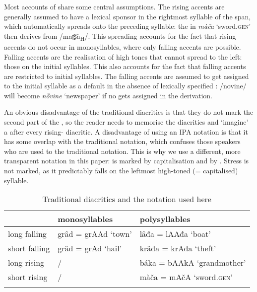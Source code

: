 \documentclass[output=paper, colorlinks, citecolor=brown, newtxmath]{langsci/langscibook}
\begin{document}
Most accounts of   share some central assumptions. The rising accents are generally assumed to have a lexical sponsor in the rightmost syllable of the span, which automatically spreads onto the preceding syllable: the  in \textit{màča} `sword.\textsc{gen}' then derives from /maʈ͡ʂa\textsubscript{H}/. This spreading accounts for the fact that rising accents do not occur in monosyllables, where only falling accents are possible. Falling accents are the realisation of high tones that cannot spread to the left: those on the initial syllables. This also accounts for the fact that falling accents are restricted to initial syllables. The falling accents are assumed to get assigned to the initial syllable as a default in the absence of lexically specified : /novine/ will become \textit{nȍvine} `newspaper' if no  gets assigned in the derivation.

An obvious disadvantage of the traditional diacritics is that they do not mark the second part of the , so the reader needs to memorise the diacritics and `imagine' a  after every rising- diacritic. A disadvantage of using an IPA notation is that it has some overlap with the traditional notation, which confuses those  speakers who are used to the traditional notation. This is why we use a different, more transparent notation in this paper:  is marked by capitalisation and  by . Stress is not marked, as it predictably falls on the leftmost high-toned (= capitalised) syllable.

\begin{table}
\caption{Traditional diacritics and the notation used here}
\label{tab1_p}
 \begin{tabular}{ l l l }
\lsptoprule & monosyllables & polysyllables\\
\midrule
long falling  &  grȃd = grAAd  `town' & lȃđa = lAAđa `boat'  \\
short falling  & grȁd = grAd  `hail' & krȁđa = krAđa `theft'
 \\
long rising  &   /  &    báka = bAAkA `grandmother'\\
short rising  &  / &  màča = mAčA `sword.\textsc{gen}'\\
 \lspbottomrule
 \end{tabular}
\end{table}
\end{document}
